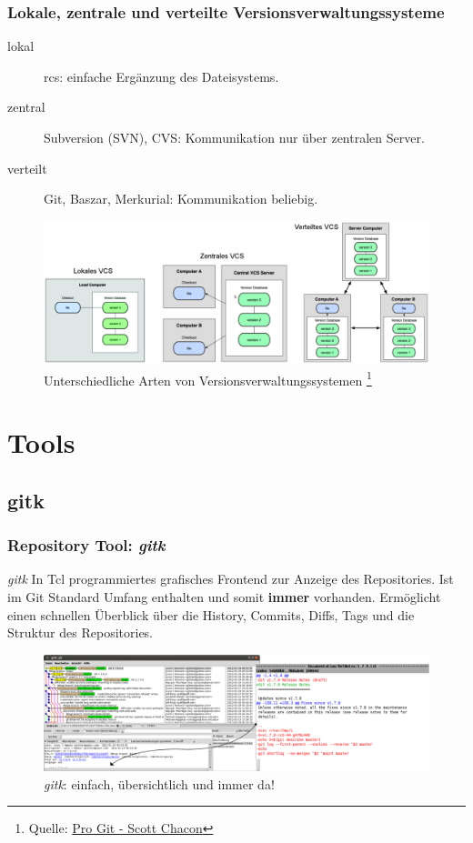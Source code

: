 \documentclass{beamer}
\begin{document}
\begin{frame}\frametitle{Lokale, zentrale und verteilte Versionsverwaltungssysteme}
\begin{description}
\item[lokal] rcs: einfache Ergänzung des Dateisystems.
\item[zentral] Subversion (SVN), CVS: Kommunikation nur über zentralen Server.
\item[verteilt] Git, Baszar, Merkurial: Kommunikation beliebig.

\end{description}

\begin{figure}
\includegraphics[scale=.15]{Bilder/VCSArten}
\caption{Unterschiedliche Arten von Versionsverwaltungssystemen
 \footnote{Quelle: \href{http://progit.org/}{Pro Git - Scott Chacon}}}
\end{figure}
\end{frame}

\section{Tools}

\subsection{gitk}

\begin{frame}\frametitle{Repository Tool: \textit{gitk}}
\begin{block}{\textit{gitk}}
In Tcl programmiertes grafisches Frontend zur Anzeige des Repositories. Ist im Git Standard Umfang enthalten und somit \textbf{immer} vorhanden. Ermöglicht einen schnellen Überblick über die History, Commits, Diffs, Tags und die Struktur des Repositories. 
\end{block}

\begin{figure}
\includegraphics[scale=0.7]{Bilder/gitk} 
\caption{\textit{gitk}: einfach, übersichtlich und immer da!}
\end{figure}
\end{frame}
\end{document}
